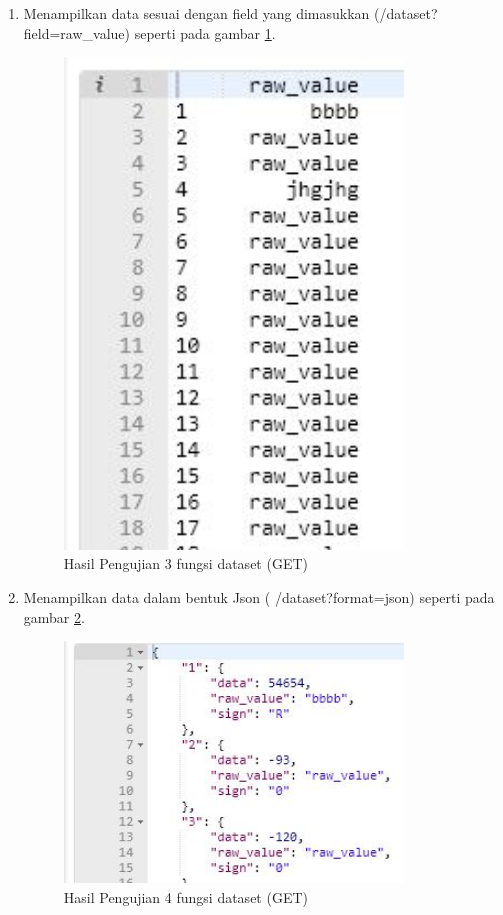 \begin{enumerate}
\item Menampilkan data sesuai dengan field yang dimasukkan (/dataset?field=raw\_value) seperti pada gambar \ref{fig:hujifd3}.
\begin{figure}[!htbp]
	\centerline{\includegraphics[width=0.85\textwidth]{figures/10/hujifd3.PNG}}
	\caption{Hasil Pengujian 3 fungsi dataset (GET)}
	\label{fig:hujifd3}
\end{figure}

\item Menampilkan data dalam bentuk Json ( /dataset?format=json) seperti pada gambar \ref{fig:hujifd4}.
\begin{figure}[!htbp]
	\centerline{\includegraphics[width=0.85\textwidth]{figures/10/hujifd4.PNG}}
	\caption{Hasil Pengujian 4 fungsi dataset (GET)}
	\label{fig:hujifd4}
\end{figure}


\end{enumerate}
